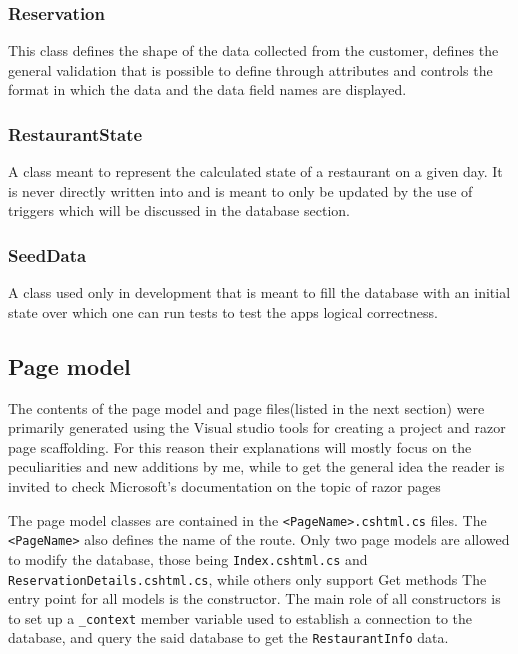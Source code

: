 \documentclass[12pt, a4paper]{article}
\begin{document}
\subsubsection{Reservation}
This class defines the shape of the data collected from the customer, defines the general validation that is possible to define through attributes and controls the format in which the data and the data field names are displayed.
\subsubsection{RestaurantState}
A class meant to represent the calculated state of a restaurant on a given day. It is never directly written into and is meant to only be updated by the use of triggers which will be discussed in the database section.
\subsubsection{SeedData}
A class used only in development that is meant to fill the database with an initial state over which one can run tests to test the apps logical correctness.

\subsection{Page model}
The contents of the page model and page files(listed in the next section) were primarily generated using the Visual studio tools for creating a project and razor page scaffolding. For this reason their explanations will mostly focus on the peculiarities and new additions by me, while to get the general idea the reader is invited to check Microsoft's documentation on the topic of razor pages

The page model classes are contained in the \texttt{<PageName>.cshtml.cs} files. The \texttt{<PageName>} also defines the name of the route. Only two page models are allowed to modify the database, those being \texttt{Index.cshtml.cs} and \texttt{ReservationDetails.cshtml.cs}, while others only support Get methods
The entry point for all models is the constructor. The main role of all constructors is to set up a \texttt{\_context} member variable used to establish a connection to the database, and query the said database to get the \texttt{RestaurantInfo} data.
\end{document}
